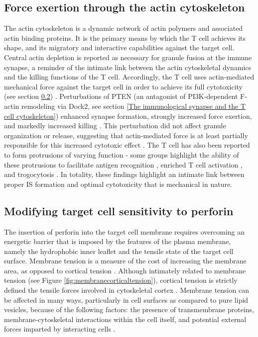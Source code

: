 \subsection{Force exertion through the actin cytoskeleton}
The actin cytoskeleton is a dynamic network of actin polymers and associated actin binding proteins. It is the primary means by which the T cell achieves its shape, and its migratory and interactive capabilities against the target cell. Central actin depletion is reported as necessary for granule fusion at the immune synapse, a reminder of the intimate link between the actin cytoskeletal dynamics and the killing functions of the T cell. Accordingly, the T cell uses actin-mediated mechanical force against the target cell in order to achieve its full cytotoxicity (see section \ref{Modifying target cell sensitivity to perforin}) \cite{Basu2016}. Perturbations of PTEN (an antagonist of PI3K-dependent F-actin remodeling via Dock2, see section \ref{The immunological synapse and the T cell cytoskeleton}) enhanced synapse formation, strongly increased force exertion, and markedly increased killing \cite{LeFloch2013, Basu2016}. This perturbation did not affect granule organization or release, suggesting that actin-mediated force is at least partially responsible for this increased cytotoxic effect \cite{Basu2016}. The T cell has also been reported to form protrusions of varying function - some groups highlight the ability of these protrusions to facilitate antigen recognition \cite{Sage2012}, enriched T cell activation \cite{Pettmann2018}, and trogocytosis \cite{Kim2018}. In totality, these findings highlight an intimate link between proper IS formation and optimal cytotoxicity that is mechanical in nature.

\subsection{Modifying target cell sensitivity to perforin}
\label{Modifying target cell sensitivity to perforin}
The insertion of perforin into the target cell membrane requires overcoming an energetic barrier that is imposed by the features of the plasma membrane, namely the hydrophobic inner leaflet and the tensile state of the target cell surface. Membrane tension is a measure of the cost of increasing the membrane area, as opposed to cortical tension \cite{Sitarska2020}. Although intimately related to membrane tension (see Figure \ref{fig:membranecorticaltension}), cortical tension is strictly defined the tensile forces involved in cytoskeletal cortex \cite{Sitarska2020}. Membrane tension can be affected in many ways, particularly in cell surfaces as compared to pure lipid vesicles, because of the following factors: the presence of transmembrane proteins, membrane-cytoskeletal interactions within the cell itself, and potential external forces imparted by interacting cells \cite{Sitarska2020}. 

